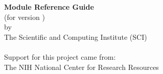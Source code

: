%
%
%
%
%
%

\begin{center}
  \vspace*{1.5in}
  {\huge\bf \sr{} Module Reference Guide}\\
  {(for \sr{} version \version{})} \\
  \vspace{0.75in}
  {\Large
    by \\
    The Scientific and Computing Institute (SCI)\\
    \\
    \vfill
    Support for this project came from:\\
    \smallskip
    The NIH National Center for Research Resources
    \vspace{0.5in}
  }
\end{center}

